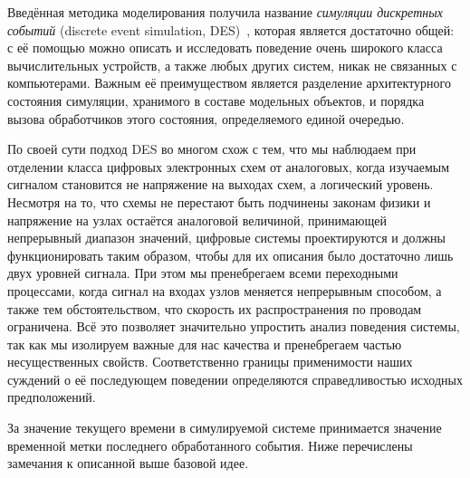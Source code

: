 
Введённая методика моделирования получила название \textit{симуляции дискретных событий} (\abbr discrete event simulation, DES)~\cite{fujimoto-parallel-dist-sim, introduction-to-des, Cain02preciseand}, которая является достаточно общей: с её помощью можно описать и исследовать поведение очень широкого класса вычислительных устройств, а также любых других систем, никак не связанных с компьютерами. Важным её преимуществом является разделение архитектурного состояния симуляции, хранимого в составе модельных объектов, и порядка вызова обработчиков этого состояния, определяемого единой очередью.

\begin{digression}
По своей сути подход DES во многом схож с тем, что мы наблюдаем при отделении класса цифровых электронных схем от аналоговых, когда изучаемым сигналом становится не напряжение на выходах схем, а логический уровень. Несмотря на то, что схемы не перестают быть подчинены законам физики и напряжение на узлах остаётся аналоговой величиной, принимающей непрерывный диапазон значений, цифровые системы проектируются и должны функционировать таким образом, чтобы для их описания было достаточно лишь двух уровней сигнала. При этом мы пренебрегаем всеми переходными процессами, когда сигнал на входах узлов меняется непрерывным способом, а также тем обстоятельством, что скорость их распространения по проводам ограничена. Всё это позволяет значительно упростить анализ поведения системы, так как мы изолируем важные для нас качества и пренебрегаем частью несущественных свойств. Соответственно границы применимости наших суждений о её последующем поведении определяются справедливостью исходных предположений.
\end{digression}

За значение текущего времени в симулируемой системе принимается значение временной метки последнего обработанного события. Ниже перечислены замечания к описанной выше базовой идее.

